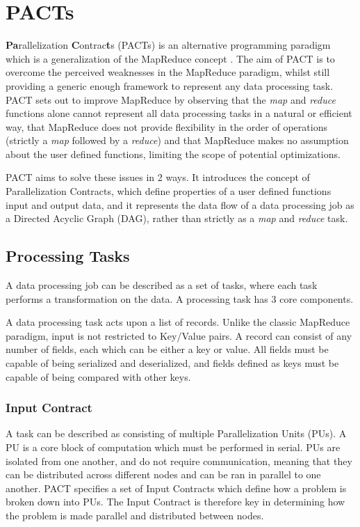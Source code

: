 \section{PACTs}
\textbf{Pa}rallelization \textbf{C}ontrac\textbf{t}s (PACTs) is an alternative programming paradigm which is a generalization of the MapReduce concept \cite{battre2010socc}. The aim of PACT is to overcome the perceived weaknesses in the MapReduce paradigm, whilst still providing a generic enough framework to represent any data processing task. PACT sets out to improve MapReduce by observing that the \textit{map} and \textit{reduce} functions alone cannot represent all data processing tasks in a natural or efficient way, that MapReduce does not provide flexibility in the order of operations (strictly a \textit{map} followed by a \textit{reduce}) and that MapReduce makes no assumption about the user defined functions, limiting the scope of potential optimizations.

PACT aims to solve these issues in 2 ways. It introduces the concept of Parallelization Contracts, which define properties of a user defined functions input and output data, and it represents the data flow of a data processing job as a Directed Acyclic Graph (DAG), rather than strictly as a \textit{map} and \textit{reduce} task.

\subsection{Processing Tasks}
A data processing job can be described as a set of tasks, where each task performs a transformation on the data. A processing task has 3 core components.

A data processing task acts upon a list of records. Unlike the classic MapReduce paradigm, input is not restricted to Key/Value pairs. A record can consist of any number of fields, each which can be either a key or value. All fields must be capable of being serialized and deserialized, and fields defined as keys must be capable of being compared with other keys. 

\subsubsection{Input Contract} 
A task can be described as consisting of multiple Parallelization Units (PUs). A PU is a core block of computation which must be performed in serial. PUs are isolated from one another, and do not require communication, meaning that they can be distributed across different nodes and can be ran in parallel to one another. PACT specifies a set of Input Contracts which define how a problem is broken down into PUs. The Input Contract is therefore key in determining how the problem is made parallel and distributed between nodes.

